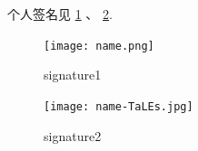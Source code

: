 \documentclass[dvipsnames, svgnames,a4paper,11pt]{article}
\begin{document}
		个人签名见 \cref{fig:name1} 、 \cref{fig:name2}.

		\begin{figure}[htbp]
			\centering
			\texttt{[image: name.png]}
			\caption{signature1}
			\label{fig:name1}
		\end{figure}
		
		\begin{figure}[htbp]
			\centering
			\texttt{[image: name-TaLEs.jpg]}
			\caption{signature2}
			\label{fig:name2}
		\end{figure}


	

	
	
\end{document}
